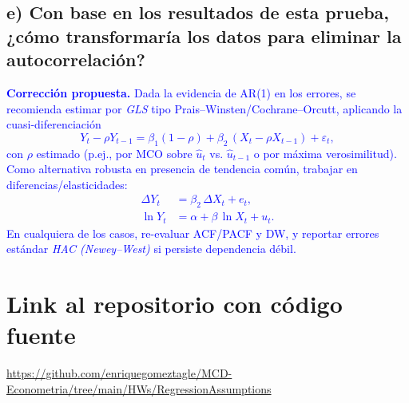 \documentclass[10pt]{article}
\begin{document}
\subsection{e) Con base en los resultados de esta prueba, ¿cómo transformaría los datos para eliminar la autocorrelación?}
\textcolor{blue}{
\textbf{Corrección propuesta.} Dada la evidencia de AR(1) en los errores, se recomienda estimar por \emph{GLS} tipo Prais--Winsten/Cochrane--Orcutt, aplicando la cuasi-diferenciación
\begin{equation*}
Y_t-\rho Y_{t-1} = \beta_1(1-\rho) + \beta_2\,(X_t-\rho X_{t-1}) + \varepsilon_t,
\end{equation*}
con $\rho$ estimado (p.ej., por MCO sobre $\hat u_t$ vs. $\hat u_{t-1}$ o por máxima verosimilitud). Como alternativa robusta en presencia de tendencia común, trabajar en diferencias/elasticidades:
\begin{align*}
\Delta Y_t &= \beta_2\,\Delta X_t + e_t,\\
\ln Y_t &= \alpha + \beta\,\ln X_t + u_t. 
\end{align*}
En cualquiera de los casos, re-evaluar ACF/PACF y DW, y reportar errores estándar \emph{HAC (Newey--West)} si persiste dependencia débil.
}
\section{Link al repositorio con código fuente}
\url{https://github.com/enriquegomeztagle/MCD-Econometria/tree/main/HWs/RegressionAssumptions}
\end{document}
